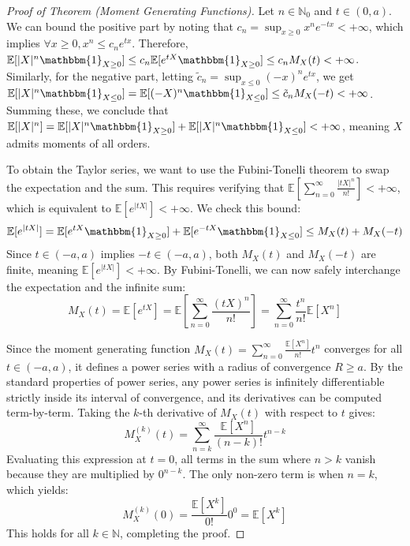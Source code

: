 \documentclass[11pt, a4paper]{article}
\begin{document}
\begin{proof}[Proof of Theorem (Moment Generating Functions)]
Let $n \in \mathbb{N}_0$ and $t \in (0, a)$. We can bound the positive part by noting that $c_n = \sup_{x \ge 0} x^n e^{-tx} < +\infty$, which implies $\forall x \ge 0, x^n \le c_n e^{tx}$.
Therefore, $\mathbb{E}[|X|^n \mathbbm{1}_{X \ge 0}] \le c_n \mathbb{E}[e^{tX} \mathbbm{1}_{X \ge 0}] \le c_n M_X(t) < +\infty$.
Similarly, for the negative part, letting $\tilde{c}_n = \sup_{x \le 0} (-x)^n e^{tx}$, we get $\mathbb{E}[|X|^n \mathbbm{1}_{X \le 0}] = \mathbb{E}[(-X)^n \mathbbm{1}_{X \le 0}] \le \tilde{c}_n M_X(-t) < +\infty$.
Summing these, we conclude that $\mathbb{E}[|X|^n] = \mathbb{E}[|X|^n \mathbbm{1}_{X \ge 0}] + \mathbb{E}[|X|^n \mathbbm{1}_{X \le 0}] < +\infty$, meaning $X$ admits moments of all orders.

To obtain the Taylor series, we want to use the Fubini-Tonelli theorem to swap the expectation and the sum. This requires verifying that $\mathbb{E}\left[\sum_{n=0}^\infty \frac{|tX|^n}{n!}\right] < +\infty$, which is equivalent to $\mathbb{E}[e^{|tX|}] < +\infty$.
We check this bound:
\[ \mathbb{E}[e^{|tX|}] = \mathbb{E}[e^{tX} \mathbbm{1}_{X \ge 0}] + \mathbb{E}[e^{-tX} \mathbbm{1}_{X \le 0}] \le M_X(t) + M_X(-t) \]
Since $t \in (-a, a)$ implies $-t \in (-a, a)$, both $M_X(t)$ and $M_X(-t)$ are finite, meaning $\mathbb{E}[e^{|tX|}] < +\infty$.
By Fubini-Tonelli, we can now safely interchange the expectation and the infinite sum:
\[ M_X(t) = \mathbb{E}[e^{tX}] = \mathbb{E}\left[\sum_{n=0}^\infty \frac{(tX)^n}{n!}\right] = \sum_{n=0}^\infty \frac{t^n}{n!} \mathbb{E}[X^n] \]

Since the moment generating function $M_X(t) = \sum_{n=0}^\infty \frac{\mathbb{E}[X^n]}{n!} t^n$ converges for all $t \in (-a, a)$, it defines a power series with a radius of convergence $R \ge a$. 
By the standard properties of power series, any power series is infinitely differentiable strictly inside its interval of convergence, and its derivatives can be computed term-by-term. 
Taking the $k$-th derivative of $M_X(t)$ with respect to $t$ gives:
\[ M_X^{(k)}(t) = \sum_{n=k}^\infty \frac{\mathbb{E}[X^n]}{(n-k)!} t^{n-k} \]
Evaluating this expression at $t = 0$, all terms in the sum where $n > k$ vanish because they are multiplied by $0^{n-k}$. The only non-zero term is when $n = k$, which yields:
\[ M_X^{(k)}(0) = \frac{\mathbb{E}[X^k]}{0!} 0^0 = \mathbb{E}[X^k] \]
This holds for all $k \in \mathbb{N}$, completing the proof.
\end{proof}
\end{document}
